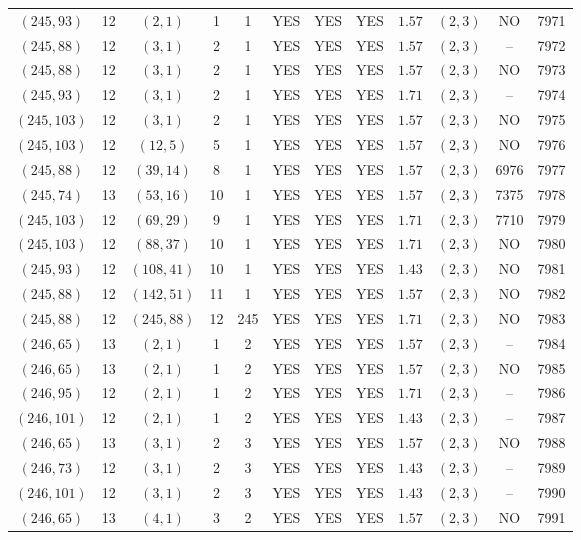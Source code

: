 \begin{longtable}{|c|c|c|c|c|c|c|c|c|c|c|c|}
$(245,93)$ & 12 & $(2,1)$ & 1 & 1 & YES & YES & YES & $1.57$ & $(2,3)$ & NO & 7971\\
$(245,88)$ & 12 & $(3,1)$ & 2 & 1 & YES & YES & YES & $1.57$ & $(2,3)$ & -- & 7972\\
$(245,88)$ & 12 & $(3,1)$ & 2 & 1 & YES & YES & YES & $1.57$ & $(2,3)$ & NO & 7973\\
$(245,93)$ & 12 & $(3,1)$ & 2 & 1 & YES & YES & YES & $1.71$ & $(2,3)$ & -- & 7974\\
$(245,103)$ & 12 & $(3,1)$ & 2 & 1 & YES & YES & YES & $1.57$ & $(2,3)$ & NO & 7975\\
$(245,103)$ & 12 & $(12,5)$ & 5 & 1 & YES & YES & YES & $1.57$ & $(2,3)$ & NO & 7976\\
$(245,88)$ & 12 & $(39,14)$ & 8 & 1 & YES & YES & YES & $1.57$ & $(2,3)$ & 6976 & 7977\\
$(245,74)$ & 13 & $(53,16)$ & 10 & 1 & YES & YES & YES & $1.57$ & $(2,3)$ & 7375 & 7978\\
$(245,103)$ & 12 & $(69,29)$ & 9 & 1 & YES & YES & YES & $1.71$ & $(2,3)$ & 7710 & 7979\\
$(245,103)$ & 12 & $(88,37)$ & 10 & 1 & YES & YES & YES & $1.71$ & $(2,3)$ & NO & 7980\\
$(245,93)$ & 12 & $(108,41)$ & 10 & 1 & YES & YES & YES & $1.43$ & $(2,3)$ & NO & 7981\\
$(245,88)$ & 12 & $(142,51)$ & 11 & 1 & YES & YES & YES & $1.57$ & $(2,3)$ & NO & 7982\\
$(245,88)$ & 12 & $(245,88)$ & 12 & 245 & YES & YES & YES & $1.71$ & $(2,3)$ & NO & 7983\\
$(246,65)$ & 13 & $(2,1)$ & 1 & 2 & YES & YES & YES & $1.57$ & $(2,3)$ & -- & 7984\\
$(246,65)$ & 13 & $(2,1)$ & 1 & 2 & YES & YES & YES & $1.57$ & $(2,3)$ & NO & 7985\\
$(246,95)$ & 12 & $(2,1)$ & 1 & 2 & YES & YES & YES & $1.71$ & $(2,3)$ & -- & 7986\\
$(246,101)$ & 12 & $(2,1)$ & 1 & 2 & YES & YES & YES & $1.43$ & $(2,3)$ & -- & 7987\\
$(246,65)$ & 13 & $(3,1)$ & 2 & 3 & YES & YES & YES & $1.57$ & $(2,3)$ & NO & 7988\\
$(246,73)$ & 12 & $(3,1)$ & 2 & 3 & YES & YES & YES & $1.43$ & $(2,3)$ & -- & 7989\\
$(246,101)$ & 12 & $(3,1)$ & 2 & 3 & YES & YES & YES & $1.43$ & $(2,3)$ & -- & 7990\\
$(246,65)$ & 13 & $(4,1)$ & 3 & 2 & YES & YES & YES & $1.57$ & $(2,3)$ & NO & 7991\\

\end{longtable}
